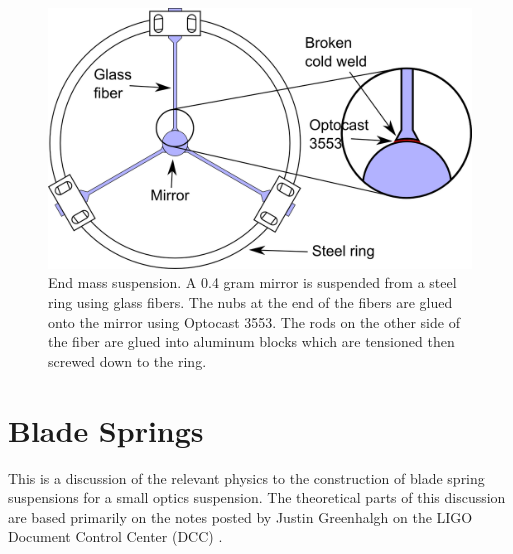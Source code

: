 \begin{figure}[htbp]
	\centering
		\includegraphics[width=.9\textwidth]{figures/suspensions/smallmass2.png}
	\caption[End mass suspension]{End mass suspension. A 0.4 gram mirror is suspended from a steel ring using glass fibers. The nubs at the end of the fibers are glued onto the mirror using Optocast 3553. The rods on the other side of the fiber are glued into aluminum blocks which are tensioned then screwed down to the ring.}
	\label{fig:smallmassdiagram}
\end{figure}




\section{Blade Springs}


This is a discussion of the relevant physics to the construction of blade spring suspensions for a small optics suspension. The theoretical parts of this discussion are based primarily on the notes posted by Justin Greenhalgh on the LIGO Document Control Center (DCC) \cite{T030285}.

